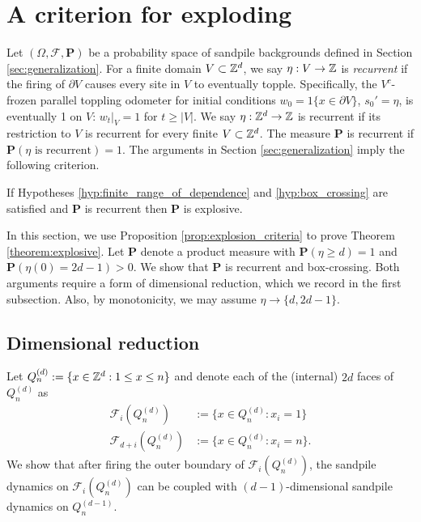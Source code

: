 \documentclass[12pt]{amsart}
\begin{document}
\section{A criterion for exploding} \label{sec:criteria}

Let $(\Omega, \mathcal{F}, \mathbf{P})$ be a probability space of sandpile backgrounds defined in Section \ref{sec:generalization}. 
For a finite domain $V \subset \mathbb{Z}^d$, we say  $\eta: V \to \mathbb{Z}$ is {\it recurrent} if the firing of $\partial V$ causes every site in $V$ to eventually topple. 
Specifically, the $V^c$-frozen parallel toppling odometer for initial conditions $w_0 = 1\{ x \in \partial V\}$, $s_0' = \eta$, 
is eventually 1 on $V$: $w_t |_{V} = 1$ for $t \geq |V|$. We say $\eta: \mathbb{Z}^d \to \mathbb{Z}$ is recurrent if its
restriction to $V$ is recurrent for every finite $V \subset \mathbb{Z}^d$.  The measure $\mathbf{P}$ is recurrent if $\mathbf{P}(\mbox{$\eta$ is recurrent}) = 1$. The arguments in Section \ref{sec:generalization} imply the following criterion. 

\begin{prop} \label{prop:explosion_criteria}
	If Hypotheses \ref{hyp:finite_range_of_dependence} and \ref{hyp:box_crossing} 
	are satisfied and $\mathbf{P}$ is recurrent
	then $\mathbf{P}$ is explosive. 
\end{prop}

In this section, we use Proposition \ref{prop:explosion_criteria} to prove Theorem \ref{theorem:explosive}.
Let $\mathbf{P}$ denote a product measure with $\mathbf{P}(\eta \geq d) = 1$ and $\mathbf{P}(\eta(0) = 2 d -1) > 0$. 
We show that $\mathbf{P}$ is recurrent and box-crossing. 
Both arguments require a form of dimensional reduction, which we record in the first subsection.
Also, by monotonicity, we may assume $\eta \to \{d, 2 d - 1\}$. 



\subsection{Dimensional reduction}
Let $Q_n^{(d)} := \{ x \in \mathbb{Z}^d : 1 \leq x \leq n\}$ and denote each of the (internal) $2d$ faces of $Q_n^{(d)}$ as 
\begin{equation}\label{eq:faces_definition}
\begin{aligned}
\mathcal{F}_i(Q_n^{(d)}) &:= \{ x \in Q_n^{(d)} : x_i = 1\} \\
\mathcal{F}_{d+i}(Q_n^{(d)}) &:= \{ x \in Q_n^{(d)} : x_i = n\}.
\end{aligned}
\end{equation}
We show that after firing the outer boundary of $\mathcal{F}_i(Q_n^{(d)})$, 
the sandpile dynamics on $\mathcal{F}_i(Q_n^{(d)})$ can be coupled
with $(d-1)$-dimensional sandpile dynamics on $Q_n^{(d-1)}$.
\end{document}
